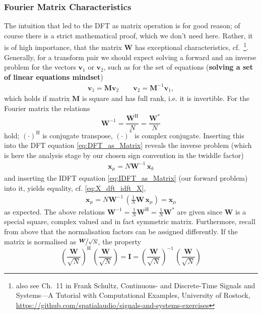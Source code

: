 \documentclass[11pt,a4paper,DIV=12]{scrartcl}
\begin{document}
\subsubsection{Fourier Matrix Characteristics}
%
The intuition that led to the DFT as matrix operation is for good reason;
of course there is a strict mathematical proof, which we don't need here.
%
Rather, it is of high importance, that
the matrix $\bm W$ has exceptional characteristics,
cf.~\cite[Ch.~IV.2]{Strang2019}\footnote{
also see Ch.~11 in Frank Schultz, Continuous- and Discrete-Time
Signals and Systems---A Tutorial with Computational Examples,
University of Rostock,
\url{https://github.com/spatialaudio/signals-and-systems-exercises}
}.
%
Generally, for a transform pair we should expect solving a forward and an
inverse problem for the vectors $\bm v_1$ or $\bm v_2$, such as for the set
of equations (\textbf{solving a set of linear equations mindset})
\begin{align}
\bm v_1 = \bm M \bm v_2\qquad \bm v_2 = \bm M^{-1} \bm v_1,
\end{align}
which holds if matrix $\bm M$ is square and has full rank, i.e. it is invertible.
%
For the Fourier matrix the relations
\begin{equation}
\mathbf{W}^{-1}
= \frac{\mathbf{W}^\mathrm{H}}{N}
= \frac{\mathbf{W}^\mathrm{*}}{N}
\end{equation}
hold; $(\cdot)^\mathrm{H}$ is conjugate transpose, $(\cdot)^*$ is
complex conjugate.
%
Inserting this into the DFT equation \eqref{eq:DFT_as_Matrix} reveals the
inverse problem (which is here the analysis stage by our chosen sign convention
in the twiddle factor)
\begin{align}
\bm{x}_\mu = N \bm{W}^{-1} \, \bm{x}_k
\end{align}
and inserting the IDFT equation \eqref{eq:IDFT_as_Matrix} (our forward problem)
into it, yields equality, cf. \eqref{eq:X_dft_idft_X},
\begin{align}
\bm{x}_\mu = N \bm{W}^{-1} \, (\frac{1}{N} \bm{W} \, \bm{x}_\mu) =
\bm x_\mu
\end{align}
as expected.
%
The above relations
$\mathbf{W}^{-1}
= \frac{1}{N} \mathbf{W}^\mathrm{H}
= \frac{1}{N} \mathbf{W}^\mathrm{*}$
are given since $\mathbf{W}$ is a special square, complex
valued and in fact symmetric matrix.
%
Furthermore, recall from above that the normalisation factors can be assigned
differently.
%
\label{pg:unitary}
If the matrix is normalised as $\nicefrac{\bm W}{\sqrt{N}}$, the property
\begin{equation}
\left(\frac{\mathbf{W}}{\sqrt{N}}\right)^\mathrm{H} \, \left(\frac{\mathbf{W}}{\sqrt{N}}\right) = \mathbf{I}
=
\left(\frac{\mathbf{W}}{\sqrt{N}} \right)^{-1} \, \left(\frac{\mathbf{W}}{\sqrt{N}} \right)
\end{equation}
\end{document}
